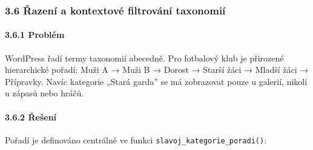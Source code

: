 \subsubsection{3.6 Řazení a kontextové filtrování
taxonomií}\label{ux159azenuxed-a-kontextovuxe9-filtrovuxe1nuxed-taxonomiuxed}

\paragraph{3.6.1 Problém}\label{probluxe9m}

WordPress řadí termy taxonomií abecedně. Pro fotbalový klub je přirozené
hierarchické pořadí: Muži A → Muži B → Dorost → Starší žáci → Mladší
žáci → Přípravky. Navíc kategorie „Stará garda'' se má zobrazovat pouze
u galerií, nikoli u zápasů nebo hráčů.

\paragraph{3.6.2 Řešení}\label{ux159eux161enuxed}

Pořadí je definováno centrálně ve funkci
\texttt{slavoj\_kategorie\_poradi()}:

\begin{Shaded}
\begin{Highlighting}[]
     \NormalTok{(}
        \NormalTok{            =\textgreater{} }\OtherTok{,}
        \NormalTok{            =\textgreater{} }\OtherTok{,}
        \NormalTok{       =\textgreater{} }\OtherTok{,}
        \NormalTok{            =\textgreater{} }\OtherTok{,}
        \NormalTok{       =\textgreater{} }\OtherTok{,}
        \NormalTok{       =\textgreater{} }\OtherTok{,}
        \NormalTok{  =\textgreater{} }\OtherTok{,}
        \NormalTok{  =\textgreater{} }\OtherTok{,}
        \NormalTok{    =\textgreater{} }\OtherTok{,}
\NormalTok{    )}\OtherTok{;}
\NormalTok{\}}
\end{Highlighting}
\end{Shaded}

